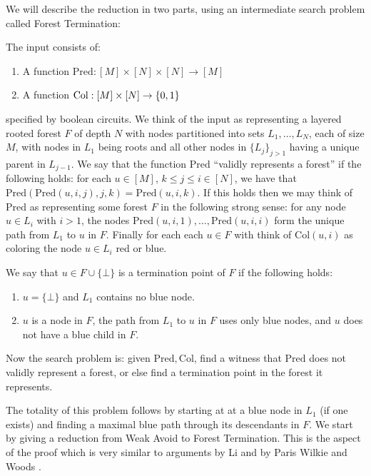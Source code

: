 \medskip
We will describe the reduction in two parts, using an intermediate search problem called {\sc Forest Termination}:
\begin{definition}\label{def:forest}
The input consists of:
\begin{enumerate}
    \item A function $\mathrm{Pred}: [M] \times [N] \times [N] \to [M]$
    \item A function $\mathrm{Col}:[M] \times [N] \to \{0,1\}$
\end{enumerate}
specified by boolean circuits. We think of the input as representing a layered rooted forest $F$ of depth $N$ with nodes partitioned into sets $L_1, \ldots, L_{N}$, each of size $M$, with nodes in $L_1$ being roots and all other nodes in $\{L_j\}_{j> 1}$ having a unique parent in $L_{j-1}$. We say that the function $\mathrm{Pred}$ ``validly represents a forest'' if the following holds: for each $u \in [M]$, $k \leq j \leq i \in [N]$, we have that $\mathrm{Pred}(\mathrm{Pred}(u,i,j),j,k) = \mathrm{Pred}(u,i,k)$. If this holds then we may think of $\mathrm{Pred}$ as representing some forest $F$ in the following strong sense: for any node $u \in L_i$ with $i >1$, the nodes $\mathrm{Pred}(u, i, 1),\ldots, \mathrm{Pred}(u,i,i)$ form the unique path from $L_1$ to $u$ in $F$. Finally for each each $u \in F$ with think of $\mathrm{Col}(u, i)$ as coloring the node $u \in L_i$ red or blue.

We say that $u \in F \cup \{\bot\}$ is a termination point of $F$ if the following holds:
\begin{enumerate}
    \item $u = \{\bot\}$ and $L_1$ contains no blue node.
    \item $u$ is a node in $F$, the path from $L_1$ to $u$ in $F$ uses only blue nodes, and $u$ does not have a blue child in $F$.
\end{enumerate}

Now the search problem is: given $\mathrm{Pred}, \mathrm{Col}$, find a witness that $\mathrm{Pred}$ does not validly represent a forest, or else find a termination point in the forest it represents.
\end{definition}
The totality of this problem follows by starting at at a blue node in $L_1$ (if one exists) and finding a maximal blue path through its descendants in $F$. We start by giving a reduction from {\sc Weak Avoid} to {\sc Forest Termination}. This is the aspect of the proof which is very similar to arguments by Li and by Paris Wilkie and Woods \cite{Li,Paris-Wilkie-Woods}.

